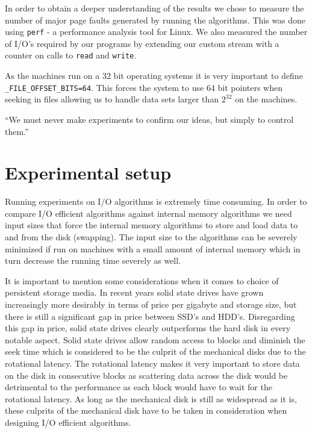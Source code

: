\documentclass[twoside,11pt,openright]{report}
\begin{document}
In order to obtain a deeper understanding of the results we chose to measure the number of major page faults generated by running the algorithms. This was done using \texttt{perf} - a performance analysis tool for Linux. We also measured the number of I/O's required by our programs by extending our custom stream with a counter on calls to \texttt{read} and \texttt{write}.

As the machines run on a 32 bit operating systems it is very important to define \texttt{\_FILE\_OFFSET\_BITS=64}. This forces the system to use 64 bit pointers when seeking in files allowing us to handle data sets larger than $2^{32}$ on the machines.

\begin{savequote}[0.55\textwidth]
``We must never make experiments to confirm our ideas, but simply to control them.''
\end{savequote}
\chapter{Experimental setup}
\label{chp:experimental_setup}
Running experiments on I/O algorithms is extremely time consuming. In order to compare I/O efficient algorithms against internal memory algorithms we need input sizes that force the internal memory algorithms to store and load data to and from the disk (swapping). The input size to the algorithms can be severely minimized if run on machines with a small amount of internal memory which in turn decrease the running time severely as well.

It is important to mention some considerations when it comes to choice of persistent storage media. In recent years solid state drives have grown increasingly more desirably in terms of price per gigabyte and storage size, but there is still a significant gap in price between SSD's and HDD's. Disregarding this gap in price, solid state drives clearly outperforms the hard disk in every notable aspect. Solid state drives allow random access to blocks and diminish the seek time which is considered to be the culprit of the mechanical disks due to the rotational latency.
The rotational latency makes it very important to store data on the disk in consecutive blocks as scattering data across the disk would be detrimental to the performance as each block would have to wait for the rotational latency. As long as the mechanical disk is still as widespread as it is, these culprits of the mechanical disk have to be taken in consideration when designing I/O efficient algorithms.
\end{document}
